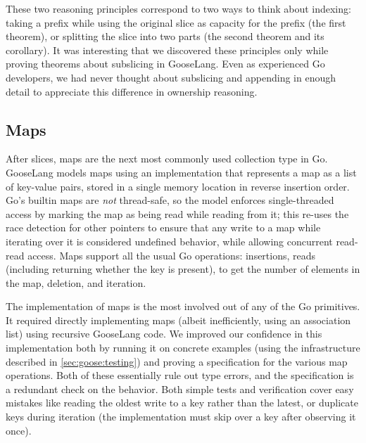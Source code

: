 These two reasoning principles correspond to two ways to think about indexing:
taking a prefix while using the original slice as capacity for the prefix (the
first theorem), or splitting the slice into two parts (the second theorem and
its corollary). It was interesting that we discovered these principles only
while proving theorems about subslicing in GooseLang. Even as experienced Go
developers, we had never thought about subslicing and appending in enough detail
to appreciate this difference in ownership reasoning.

\subsection{Maps}%
\label{sec:goose:maps}


After slices, maps are the next most commonly used collection type in
Go. GooseLang models maps using an implementation that represents a map as a
list of key-value pairs, stored in a single memory location in reverse insertion
order. Go's builtin maps are
\emph{not} thread-safe, so the model enforces single-threaded access by
marking the map as being read while reading from it; this re-uses the
race detection for other pointers to ensure that any write to a map while iterating
over it is considered
undefined behavior, while allowing concurrent read-read access. Maps
support all the usual Go operations: insertions, reads (including returning
whether the key is present),  to get the number of elements
in the map, deletion, and iteration.

The implementation of maps is the most involved out of any of the Go
primitives. It required directly implementing maps (albeit
inefficiently, using an association list) using recursive GooseLang
code. We improved our confidence in this
implementation both by running it on concrete examples (using the infrastructure
described in \cref{sec:goose:testing}) and proving a specification for the
various map operations. Both of these
essentially rule out type errors,
and the specification is a redundant check on the behavior. Both simple tests and verification
cover easy mistakes like reading the oldest write to a key rather than
the latest, or duplicate keys during iteration (the implementation must
skip over a key after observing it once).

